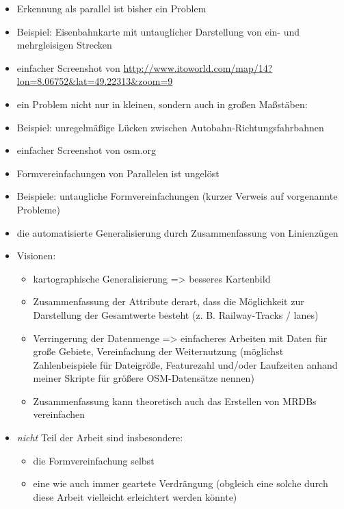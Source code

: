 \documentclass{../thesis}
\begin{document}
\begin{itemize}
	
	\item Erkennung als parallel ist bisher ein Problem
	
	\item Beispiel: Eisenbahnkarte mit untauglicher Darstellung von ein- und mehrgleisigen Strecken
		\item einfacher Screenshot von \url{http://www.itoworld.com/map/14?lon=8.06752&lat=49.22313&zoom=9}
	
	\item ein Problem nicht nur in kleinen, sondern auch in großen Maßstäben:
	
	\item Beispiel: unregelmäßige Lücken zwischen Autobahn-Richtungsfahrbahnen
		\item einfacher Screenshot von osm.org
	
	\item Formvereinfachungen von Parallelen ist ungelöst
	\item Beispiele: untaugliche Formvereinfachungen (kurzer Verweis auf vorgenannte Probleme)
	
	\item {} die automatisierte Generalisierung durch Zusammenfassung von Linienzügen
	
	\item Visionen:
	\begin{itemize}
		\item kartographische Generalisierung => besseres Kartenbild
			\item Zusammenfassung der Attribute derart, dass die Möglichkeit zur Darstellung der Gesamtwerte besteht (z. B. Railway-Tracks / lanes)
		\item Verringerung der Datenmenge => einfacheres Arbeiten mit Daten für große Gebiete, Vereinfachung der Weiternutzung
			(möglichst Zahlenbeispiele für Dateigröße, Featurezahl und/oder Laufzeiten anhand meiner Skripte für größere OSM-Datensätze nennen)
		\item Zusammenfassung kann theoretisch auch das Erstellen von MRDBs vereinfachen
	\end{itemize}
	
	\item \emph{nicht} Teil der Arbeit sind insbesondere:
	\begin{itemize}
		\item die Formvereinfachung selbst
		\item eine wie auch immer geartete Verdrängung (obgleich eine solche durch diese Arbeit vielleicht erleichtert werden könnte)
	\end{itemize}
\end{itemize}
\end{document}
